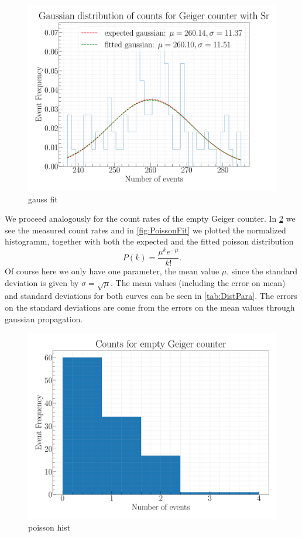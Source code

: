 \begin{figure}[H]
\centering
\includegraphics[width=\textwidth]{../Figures/Geiger_gauss_fit.pdf}
\caption{gauss fit}
\label{fig:GaussFit}
\end{figure}

We proceed analogously for the count rates of the empty Geiger counter. In \cref{fig:PoissonHist} we see the measured count rates and in \cref{fig:PoissonFit} we plotted the normalized histogramm, together with both the expected and the fitted poisson distribution
\begin{equation}
P(k) = \frac{\mu^k e^{-\mu}}{k!}.
\end{equation}
Of course here we only have one parameter, the mean value $\mu$, since the standard deviation is given by $\sigma = \sqrt{\mu}$. The mean values (including the error on mean) and standard deviations for both curves can be seen in \cref{tab:DistPara}. The errors on the standard deviations are come from the errors on the mean values through gaussian propagation.

\begin{figure}[H]
\centering
\includegraphics[width=\textwidth]{../Figures/Geiger_poisson_histogram.pdf}
\caption{poisson hist}
\label{fig:PoissonHist}
\end{figure}

